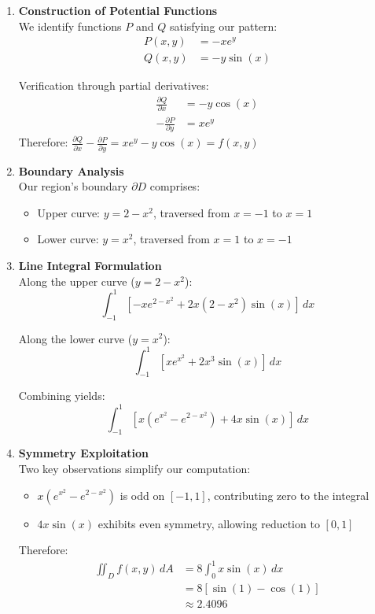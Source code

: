 \begin{example}
\begin{solution}
\begin{enumerate}
\item \textbf{Construction of Potential Functions}\\
We identify functions $P$ and $Q$ satisfying our pattern:
\begin{align*}
P(x,y) &= -xe^y \\
Q(x,y) &= -y\sin(x)
\end{align*}

Verification through partial derivatives:
\begin{align*}
\frac{\partial Q}{\partial x} &= -y\cos(x) \\
-\frac{\partial P}{\partial y} &= xe^y
\end{align*}
Therefore: $\frac{\partial Q}{\partial x} - \frac{\partial P}{\partial y} = xe^y - y\cos(x) = f(x,y)$

\item \textbf{Boundary Analysis}\\
Our region's boundary $\partial D$ comprises:
\begin{itemize}
   \item Upper curve: $y = 2-x^2$, traversed from $x = -1$ to $x = 1$
   \item Lower curve: $y = x^2$, traversed from $x = 1$ to $x = -1$
\end{itemize}

\item \textbf{Line Integral Formulation}\\
Along the upper curve ($y = 2-x^2$):
\[
\int_{-1}^1 [-xe^{2-x^2} + 2x(2-x^2)\sin(x)]\,dx
\]

Along the lower curve ($y = x^2$):
\[
\int_{-1}^1 [xe^{x^2} + 2x^3\sin(x)]\,dx
\]

Combining yields:
\[
\int_{-1}^1 [x(e^{x^2} - e^{2-x^2}) + 4x\sin(x)]\,dx
\]

\item \textbf{Symmetry Exploitation}\\
Two key observations simplify our computation:
\begin{itemize}
   \item $x(e^{x^2} - e^{2-x^2})$ is odd on $[-1,1]$, contributing zero to the integral
   \item $4x\sin(x)$ exhibits even symmetry, allowing reduction to $[0,1]$
\end{itemize}

Therefore:
\begin{align*}
\iint_D f(x,y)\,dA &= 8\int_0^1 x\sin(x)\,dx \\
&= 8[\sin(1) - \cos(1)] \\
&\approx 2.4096
\end{align*}
\end{enumerate}


\end{solution}
\end{example}
